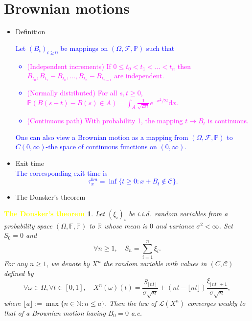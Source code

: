 \documentclass[serif,professionalfont,tree,usepdftitle=false, slidestop]{beamer}
\numberwithin{equation}{section}
\newcommand{\duong}[1]{\textcolor{blue}{#1}}
\newcommand{\hong}[1]{\textcolor{magenta}{#1}}
\newcommand{\vang}[1]{\textcolor{yellow}{#1}}
\begin{document}
\section{Brownian motions}
\begin{frame}
\begin{itemize}
\item Definition\\
\duong{ Let $(B_t)_{t\ge 0}$ be mappings on $(\Omega, \mathcal F, \mathbb P)$ such that 
\begin{itemize}
\item \hong{(Independent increments) If $0\le t_0<t_1<\ldots<t_n$ then $B_{t_0}, B_{t_1}-B_{t_0}, \ldots, B_{t_n}-B_{t_{n-1}}$ are independent. }
\item\hong{(Normally distributed) For all $s, t\ge 0$, $\mathbb P(B(s + t)-B(s)\in A) = \int_A \frac{1}{\sqrt {2\pi t}}e^{-x^2/2t}\text{d}x$.}
\item\hong{(Continuous path) With probability 1, the mapping $t\to B_t$ is continuous.}
\end{itemize}}
\duong{One can also view a Brownian motion as a mapping from $(\Omega, \mathcal F, \mathbb P)$ to $C(0, \infty)$-the space of continuous functions on $(0, \infty)$.}
\item Exit time\\
\duong{The corresponding exit time is 
\[
\tau_x^{bm} = \inf\{t\ge 0: x + B_t\notin \mathcal C\}.
\]}
\item The Donsker's theorem
\end{itemize}
\end{frame}
\begin{frame}
\newtheorem*{thm}{\vang{\large \bf The Donsker's theorem}}
\begin{thm}
Let $(\xi_i)_i$ be i.i.d.\ random variables from a probability space $(\Omega, \mathbb{F}, \mathbb P)$ to $\mathbb{R}$ whose mean is $0$ and variance $\sigma^2 < \infty$. Set $S_0 = 0$ and
\begin{equation} \label{e2}
\forall n \ge 1, \quad S_n = \sum\limits_{i=1}^{n} \xi_i.\nonumber
\end{equation}
For any $n \ge 1$, we denote by $X^n$ the random variable with values in $(C, \mathcal{C})$ defined by
\begin{equation} \label{e3}
\forall \omega \in \Omega, \forall t \in [0, 1], \quad X^n(\omega)(t) = \frac{S_{\lfloor nt \rfloor}}{\sigma\sqrt{n}} + \left(nt - \lfloor nt \rfloor \right)\frac{\xi_{\lfloor nt \rfloor + 1}}{\sigma\sqrt{n}},\nonumber
\end{equation}
where $\lfloor a\rfloor := \max\{n\in \mathbb N: n\leq a\}$. Then the law of $\mathcal{L}(X^n)$ converges weakly to that of a Brownian motion having $B_0 = 0$ a.e.
\end{thm}
\end{frame}
\end{document}

